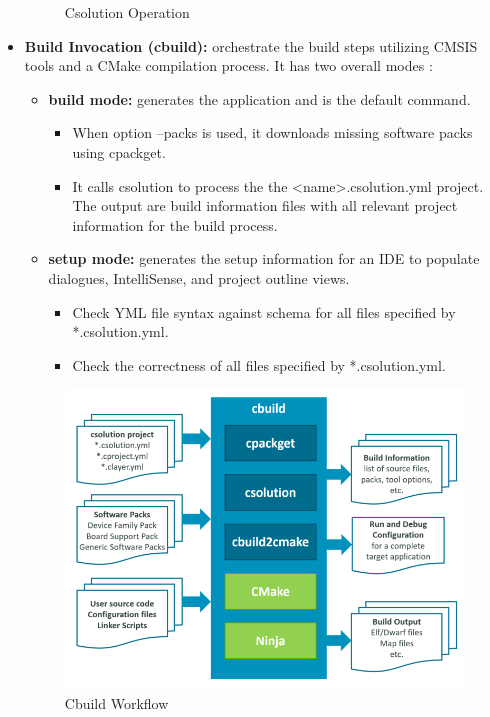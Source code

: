 \begin{itemize}
\begin{figure}[H]
      \caption{Csolution Operation}
      \label{fig:csolution_op}
    \end{figure}    
    \item \textbf{Build Invocation (cbuild):} orchestrate the build steps utilizing CMSIS tools and a CMake compilation process. It has two overall modes :
    \begin{itemize}
        \item \textbf{build mode:} generates the application and is the default command.
        \begin{itemize}
            \item When option --packs is used, it downloads missing software packs using cpackget.
            \item It calls csolution to process the the <name>.csolution.yml project. The output are build information files with all relevant project information for the build process.
        \end{itemize}
        \item  \textbf{setup mode:} generates the setup information for an IDE to populate dialogues, IntelliSense, and project outline views.
        \begin{itemize}
            \item Check YML file syntax against schema for all files specified by *.csolution.yml.
            \item Check the correctness of all files specified by *.csolution.yml.
        \end{itemize}
    \end{itemize}
    \begin{figure}[H]
      \centering
      \includegraphics[width=15cm]{img/ST_Summer_Internship/cbuild-workflow.png}
      \caption{Cbuild Workflow}
      \label{fig:cbuild_wf}
    \end{figure}
\end{itemize}
